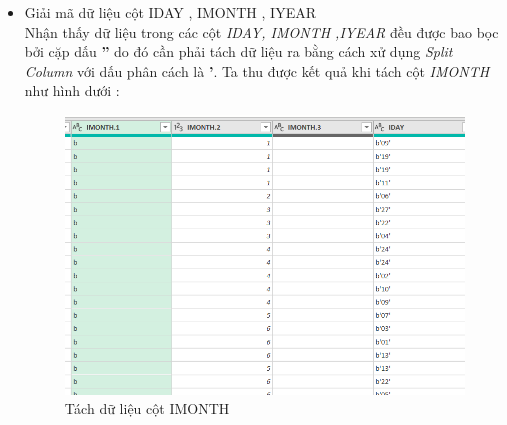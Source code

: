 \begin{itemize}
    \item Giải mã dữ liệu cột IDAY , IMONTH , IYEAR \\\hfill
    Nhận thấy dữ liệu trong các cột \textit{IDAY, IMONTH ,IYEAR} đều được bao bọc bởi cặp dấu \textbf{''} do đó cần phải tách dữ liệu ra bằng cách xử dụng \textit{Split Column } với dấu phân cách là \textbf{'}. Ta thu được kết quả khi tách cột \textit{IMONTH} như hình dưới :\\
    
            \begin{figure}[!h]
                \begin{center}
                \includegraphics[scale = 0.8]{HONG/2.png}
              \caption{Tách dữ liệu cột IMONTH}
         

\end{center}
\end{figure}
\end{itemize}
